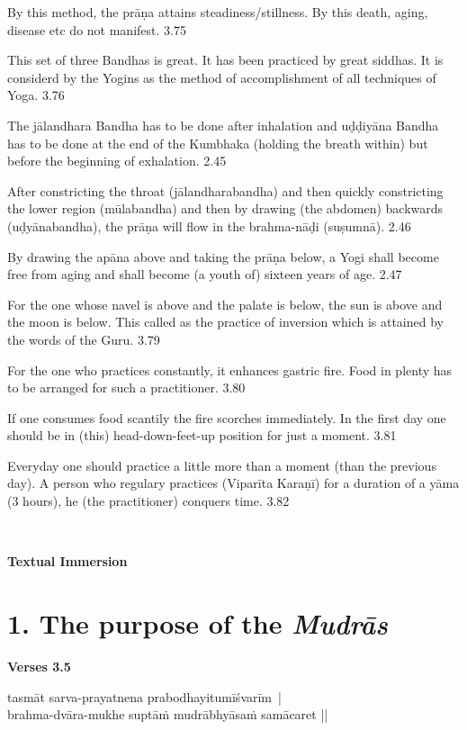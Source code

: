 By this method, the prāṇa attains steadiness/stillness. By this death, aging, disease etc do not manifest. 3.75

This set of three Bandhas is great. It has been practiced by great siddhas. It is considerd by the Yogins as the method of accomplishment of all techniques of Yoga.   3.76


The jālandhara Bandha has to be done after inhalation and uḍḍiyāna Bandha has to be done at the end of the Kumbhaka (holding the breath within) but before the beginning of exhalation. 2.45

After constricting the throat (jālandharabandha) and then quickly constricting the lower region (mūlabandha) and then by drawing (the abdomen) backwards (uḍyānabandha), the prāṇa will flow in the brahma-nāḍi (suṣumnā). 2.46

By drawing the apāna above and taking the prāṇa below, a Yogi shall become free from aging and shall become (a youth of) sixteen years of age. 2.47


For the one whose navel is above and the palate is below, the sun is above and the moon is below. This called as the practice of inversion which is attained by the words of the Guru. 3.79

For the one who practices constantly, it enhances gastric fire. Food in plenty has to be arranged for such a practitioner. 3.80

If one consumes food scantily the fire scorches immediately. In the first day one should be in (this) head-down-feet-up position for just a moment. 3.81

Everyday one should practice a little more than a moment (than the previous day). A person who regulary practices (Viparīta Karaṇī) for a duration of a yāma (3 hours), he (the practitioner) conquers time. 3.82
\newpage

\thispagestyle{empty}
~\vfill
\centerline{\textbf{\LARGE Textual Immersion}}
\vfill
\eject

\section*{1. The purpose of the \textit{Mudrās}}

\noindent 
\textbf{Verses  3.5}

\begin{shloka}
tasmāt sarva-prayatnena prabodhayitumīśvarīm |\\
brahma-dvāra-mukhe suptāṁ mudrābhyāsaṁ samācaret ||
\end{shloka}

